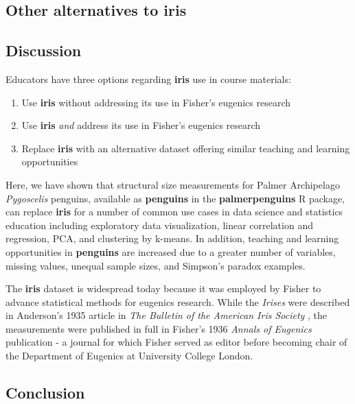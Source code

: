 \hypertarget{other-alternatives-to-iris}{%
\subsection{Other alternatives to
iris}\label{other-alternatives-to-iris}}

\hypertarget{discussion}{%
\subsection{Discussion}\label{discussion}}

Educators have three options regarding \textbf{iris} use in course
materials:

\begin{enumerate}
\def\labelenumi{\arabic{enumi}.}
\tightlist
\item
  Use \textbf{iris} without addressing its use in Fisher's eugenics
  research
\item
  Use \textbf{iris} \emph{and} address its use in Fisher's eugenics
  research
\item
  Replace \textbf{iris} with an alternative dataset offering similar
  teaching and learning opportunities
\end{enumerate}

Here, we have shown that structural size measurements for Palmer
Archipelago \emph{Pygoscelis} penguins, available as \textbf{penguins}
in the \textbf{palmerpenguins} R package, can replace \textbf{iris} for
a number of common use cases in data science and statistics education
including exploratory data visualization, linear correlation and
regression, PCA, and clustering by k-means. In addition, teaching and
learning opportunities in \textbf{penguins} are increased due to a
greater number of variables, missing values, unequal sample sizes, and
Simpson's paradox examples.

The \textbf{iris} dataset is widespread today because it was employed by
Fisher to advance statistical methods for eugenics research. While the
\emph{Irises} were described in Anderson's 1935 article in \emph{The
Bulletin of the American Iris Society} \citep{anderson_irises_1935}, the
measurements were published in full in Fisher's 1936 \emph{Annals of
Eugenics} publication \citep{fisher_use_1936} - a journal for which
Fisher served as editor before becoming chair of the Department of
Eugenics at University College London.

\hypertarget{conclusion}{%
\subsection{Conclusion}\label{conclusion}}

